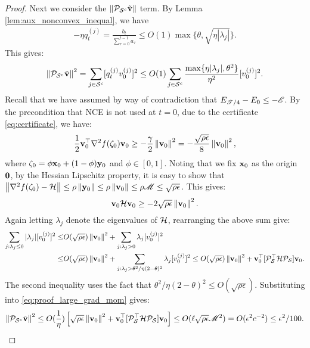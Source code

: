 \begin{proof}
Next we consider the $\left\|{\mathcal{P}_{\mathcal{S}^c} \tilde{\mathbf{v}}}\right\|$ term. 
By Lemma \ref{lem:aux_nonconvex_inequal}, we have
\begin{align*}
 - \eta q_t^{(j)}  = \frac{b_t}{\sum_{\tau = 0}^{t-1} a_\tau} \le O(1)\max\{\theta, \sqrt{\eta|\lambda_j|}\}.
\end{align*}
This gives:
\begin{equation}\label{eq:proof_large_grad_mom}
\left\|{\mathcal{P}_{\mathcal{S}^c} \tilde{\mathbf{v}}}\right\|^2  = \sum_{j\in\mathcal{S}^c} [q^{(j)}_t  v_0^{(j)}]^2 
\le O(1)\sum_{j\in\mathcal{S}^c}  \frac{\max\{ \eta|\lambda_j|, \theta^2\}}{\eta^2}  [v_0^{(j)}]^2.
\end{equation}
Recall that we have assumed by way of contradiction that $E_{\mathscr{T}/4} - E_0 \le - \mathscr{E}$.
By the precondition that NCE is not used at $t=0$, due to the certificate \eqref{eq:certificate}, we have:
\begin{equation*}
\frac{1}{2} \mathbf{v}_0^{\top} 
\nabla^2 f(\zeta_0) \mathbf{v}_0 \ge - \frac{\gamma}{2} \left\|{\mathbf{v}_0}\right\|^2 = -\frac{\sqrt{\rho\epsilon}}{8} \left\|{\mathbf{v}_0}\right\|^2,
\end{equation*}
where $\zeta_0 = \phi\mathbf{x}_0 + (1-\phi)\mathbf{y}_0$ and $\phi \in [0, 1]$. Noting that we fix $\mathbf{x}_0$ as the origin $\mathbf{0}$, by the Hessian Lipschitz property, it is easy to show that
$\left\|{\nabla^2 f(\zeta_0) - \mathcal{H}}\right\| \le \rho\left\|{\mathbf{y}_0}\right\| \le \rho \left\|{\mathbf{v}_0}\right\| \le \rho \mathscr{M} \le \sqrt{\rho\epsilon}$. This gives:
\begin{equation*}
\mathbf{v}_0 \mathcal{H} \mathbf{v}_0 \ge -2\sqrt{\rho\epsilon} \left\|{\mathbf{v}_0}\right\|^2.
\end{equation*}
Again letting $\lambda_j$ denote the eigenvalues of $\mathcal{H}$, rearranging the above sum give:
\begin{align*}
\sum_{j:\lambda_j\le 0} |\lambda_j|[v_0^{(j)}]^2
 \le& O(\sqrt{\rho\epsilon})\left\|{\mathbf{v}_0}\right\|^2 + \sum_{j:\lambda_j> 0} \lambda_j[v_0^{(j)}]^2 \\
 \le&  O(\sqrt{\rho\epsilon})\left\|{\mathbf{v}_0}\right\|^2 + \sum_{j:\lambda_j> \theta^2/\eta(2-\theta)^2} \lambda_j[v_0^{(j)}]^2
 \le O(\sqrt{\rho\epsilon})\left\|{\mathbf{v}_0}\right\|^2 + \mathbf{v}_0^{\top} [\mathcal{P}_{\mathcal{S}}^{\top} \mathcal{H} \mathcal{P}_{\mathcal{S}}] \mathbf{v}_0.
\end{align*}
The second inequality uses the fact that $\theta^2/\eta(2-\theta)^2 \le O(\sqrt{\rho\epsilon})$.
Substituting into \eqref{eq:proof_large_grad_mom} gives:
\begin{equation*}
\left\|{\mathcal{P}_{\mathcal{S}^c} \tilde{\mathbf{v}}}\right\|^2  \le
O(\frac{1}{\eta})\left[\sqrt{\rho\epsilon}\left\|{\mathbf{v}_0}\right\|^2 + \mathbf{v}_0^{\top} [\mathcal{P}_{\mathcal{S}}^{\top} \mathcal{H} \mathcal{P}_{\mathcal{S}}] \mathbf{v}_0 \right]
\le O(\ell\sqrt{\rho\epsilon}\mathscr{M}^2) = O(\epsilon^2 c^{-2}) \le \epsilon^2/100.
\end{equation*}

\end{proof}
